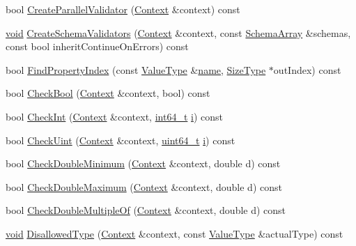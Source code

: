 \begin{DoxyCompactItemize}
bool \hyperlink{classinternal_1_1Schema_a8591e7af5ca64435afe99a4777bda2a1}{Create\+Parallel\+Validator} (\hyperlink{classinternal_1_1Schema_ac3f54abfefe300c5610c1205869cfd66}{Context} \&context) const
\item 
\hyperlink{imgui__impl__opengl3__loader_8h_ac668e7cffd9e2e9cfee428b9b2f34fa7}{void} \hyperlink{classinternal_1_1Schema_ab63ccbc0129a562788f6263580003965}{Create\+Schema\+Validators} (\hyperlink{classinternal_1_1Schema_ac3f54abfefe300c5610c1205869cfd66}{Context} \&context, const \hyperlink{structinternal_1_1Schema_1_1SchemaArray}{Schema\+Array} \&schemas, const bool inherit\+Continue\+On\+Errors) const
\item 
bool \hyperlink{classinternal_1_1Schema_a25af17593efefc57468dad9daee0c26a}{Find\+Property\+Index} (const \hyperlink{classinternal_1_1Schema_a8976b6d7e2a885483d0b51d941019340}{Value\+Type} \&\hyperlink{imgui__impl__opengl3__loader_8h_a5c4947d4516dd7cfa3505ce3a648a4ef}{name}, \hyperlink{rapidjson_8h_a5ed6e6e67250fadbd041127e6386dcb5}{Size\+Type} $\ast$out\+Index) const
\item 
bool \hyperlink{classinternal_1_1Schema_a7460717070f7e73b77b9d3bcb00931da}{Check\+Bool} (\hyperlink{classinternal_1_1Schema_ac3f54abfefe300c5610c1205869cfd66}{Context} \&context, bool) const
\item 
bool \hyperlink{classinternal_1_1Schema_a6d1f3ada8d8151319b1db505352651e6}{Check\+Int} (\hyperlink{classinternal_1_1Schema_ac3f54abfefe300c5610c1205869cfd66}{Context} \&context, \hyperlink{stdint_8h_a414156feea104f8f75b4ed9e3121b2f6}{int64\+\_\+t} \hyperlink{game__play__state_8cpp_acb559820d9ca11295b4500f179ef6392}{i}) const
\item 
bool \hyperlink{classinternal_1_1Schema_a0ac91a6f4d1e3d6267fb9656d84f275a}{Check\+Uint} (\hyperlink{classinternal_1_1Schema_ac3f54abfefe300c5610c1205869cfd66}{Context} \&context, \hyperlink{stdint_8h_aec6fcb673ff035718c238c8c9d544c47}{uint64\+\_\+t} \hyperlink{game__play__state_8cpp_acb559820d9ca11295b4500f179ef6392}{i}) const
\item 
bool \hyperlink{classinternal_1_1Schema_a5f20099e94e0212a83844e3431c40672}{Check\+Double\+Minimum} (\hyperlink{classinternal_1_1Schema_ac3f54abfefe300c5610c1205869cfd66}{Context} \&context, double d) const
\item 
bool \hyperlink{classinternal_1_1Schema_a941437c7594d2d1a66aab371c08dcd4a}{Check\+Double\+Maximum} (\hyperlink{classinternal_1_1Schema_ac3f54abfefe300c5610c1205869cfd66}{Context} \&context, double d) const
\item 
bool \hyperlink{classinternal_1_1Schema_a37661b410dacee6924261631e4a1a2c9}{Check\+Double\+Multiple\+Of} (\hyperlink{classinternal_1_1Schema_ac3f54abfefe300c5610c1205869cfd66}{Context} \&context, double d) const
\item 
\hyperlink{imgui__impl__opengl3__loader_8h_ac668e7cffd9e2e9cfee428b9b2f34fa7}{void} \hyperlink{classinternal_1_1Schema_a6c88cbcc1abfdfdafdf893662118564e}{Disallowed\+Type} (\hyperlink{classinternal_1_1Schema_ac3f54abfefe300c5610c1205869cfd66}{Context} \&context, const \hyperlink{classinternal_1_1Schema_a8976b6d7e2a885483d0b51d941019340}{Value\+Type} \&actual\+Type) const
\end{DoxyCompactItemize}
